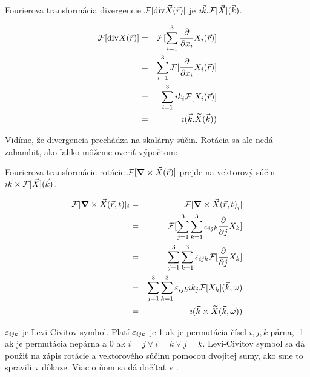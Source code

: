 \begin{veta}
Fourierova transformácia divergencie
$\mathcal{F}[{\rm div}{\vec{X}}(\vec{r})]$  je $ \imath \vec{k} .
\mathcal{F}[\vec{X}](\vec{k})$.
\end{veta}
\begin{dokaz}

\def\r{(\vektor{r})}
\def\k{(\vektor{k})}

\begin{eqnarray*}
    \fourier[\div{\vektor{X}\r}] &=& \fourier[\sum_{i=1}^3 \pd{}{x_i}
    X_i\r] \\
    &=& \sum_{i=1}^3 \fourier[ \pd{}{x_i} X_i\r]  \\
    &=& \sum_{i=1}^3 \imath k_i \fourier[X_i\r] \\
    &=& \imath ( \vektor{k} . \dual{X} \k)
\end{eqnarray*}
\end{dokaz}

Vidíme, že divergencia prechádza na skalárny súčin. Rotácia sa ale
nedá zahambiť, ako ľahko môžeme overiť výpočtom:


\begin{veta}
Fourierova transformácie rotácie 
$\mathcal{F}[\mbox{\boldmath$ \nabla $} \times \vec{X}(\vec{r})]$  prejde na vektorový súčin 
$ \imath \vec{k} \times \mathcal{F}[\vec{X}](\vec{k})$.
\end{veta}

\begin{dokaz}
\begin{eqnarray*}
    \mathcal{F}[\mbox{\boldmath$ \nabla $} \times \vec{X}{(\vec{r},t)}]_i &=& 
    \mathcal{F}[\mbox{\boldmath$ \nabla $} \times \vec{X}{(\vec{r},t)}_i] \\
    &=& \mathcal{F}[\sum_{j=1}^3 \sum_{k=1}^3 \varepsilon_{ijk} \frac{\partial }{\partial j} X_k] \\
    &=& \sum_{j=1}^3 \sum_{k=1}^3 \varepsilon_{ijk} \mathcal{F}[\frac{\partial }{\partial j} X_k] \\
    &=& \sum_{j=1}^3 \sum_{k=1}^3 \varepsilon_{ijk} \imath k_j \mathcal{F}[X_k]{(\vec{k},\omega)} \\
    &=& \imath ( \vec{k} \times \widetilde{X}{(\vec{k},\omega)} )
\end{eqnarray*} 
\end{dokaz}

\begin{poznamka}
$\varepsilon_{ijk}$ je Levi-Civitov symbol. Platí $\varepsilon_{ijk}$ je 1 ak je
permutácia čísel $i,j,k$ párna, -1 ak je permutácia nepárna a 0 ak
$i=j \lor i=k \lor j=k$. Levi-Civitov symbol sa dá použiť na zápis
rotácie a vektorového súčinu pomocou dvojitej sumy, ako sme to
spravili v dôkaze. Viac o ňom sa dá dočítať v \todo{}.
\end{poznamka}


